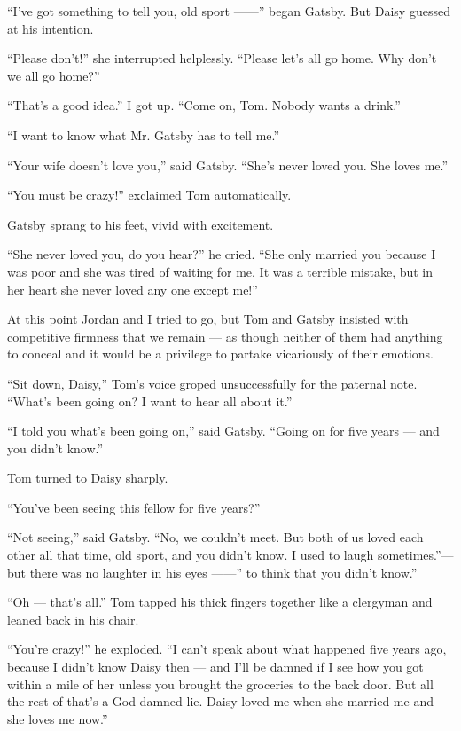 \documentclass{znotebook}
\begin{document}
``I’ve got something to tell you, old sport ——'' began Gatsby. But Daisy guessed at his intention.

``Please don’t!'' she interrupted helplessly. ``Please let’s all go home. Why don’t we all go home?''

``That’s a good idea.'' I got up. ``Come on, Tom. Nobody wants a drink.''

``I want to know what Mr. Gatsby has to tell me.''

``Your wife doesn’t love you,'' said Gatsby. ``She’s never loved you. She loves me.''

``You must be crazy!'' exclaimed Tom automatically.

Gatsby sprang to his feet, vivid with excitement.

``She never loved you, do you hear?'' he cried. ``She only married you because I was poor and she was tired of waiting for me. It was a terrible mistake, but in her heart she never loved any one except me!''

At this point Jordan and I tried to go, but Tom and Gatsby insisted with competitive firmness that we remain — as though neither of them had anything to conceal and it would be a privilege to partake vicariously of their emotions.

``Sit down, Daisy,'' Tom’s voice groped unsuccessfully for the paternal note. ``What’s been going on? I want to hear all about it.''

``I told you what’s been going on,'' said Gatsby. ``Going on for five years — and you didn’t know.''

Tom turned to Daisy sharply.

``You’ve been seeing this fellow for five years?''

``Not seeing,'' said Gatsby. ``No, we couldn’t meet. But both of us loved each other all that time, old sport, and you didn’t know. I used to laugh sometimes.''— but there was no laughter in his eyes ——'' to think that you didn’t know.''

``Oh — that’s all.'' Tom tapped his thick fingers together like a clergyman and leaned back in his chair.

``You’re crazy!'' he exploded. ``I can’t speak about what happened five years ago, because I didn’t know Daisy then — and I’ll be damned if I see how you got within a mile of her unless you brought the groceries to the back door. But all the rest of that’s a God damned lie. Daisy loved me when she married me and she loves me now.''
\end{document}
